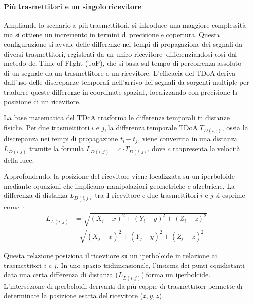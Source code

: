 \paragraph{Più trasmettitori e un singolo ricevitore}

Ampliando lo scenario a più trasmettitori, si introduce una maggiore complessità ma si ottiene un incremento in termini di precisione e copertura. Questa configurazione si avvale delle differenze nei tempi di propagazione dei segnali da diversi trasmettitori, registrati da un unico ricevitore, differenziandosi così dal metodo del Time of Flight (ToF), che si basa sul tempo di percorrenza assoluto di un segnale da un trasmettitore a un ricevitore. L'efficacia del TDoA deriva dall'uso delle discrepanze temporali nell'arrivo dei segnali da sorgenti multiple per tradurre queste differenze in coordinate spaziali, localizzando con precisione la posizione di un ricevitore.

La base matematica del TDoA trasforma le differenze temporali in distanze fisiche. Per due trasmettitori \(i\) e \(j\), la differenza temporale TDoA \(T_{D(i,j)}\), ossia la discrepanza nei tempi di propagazione \(t_i - t_j\), viene convertita in una distanza \(L_{D(i,j)}\) tramite la formula \(L_{D(i,j)} = c \cdot T_{D(i,j)}\), dove \(c\) rappresenta la velocità della luce.

Approfondendo, la posizione del ricevitore viene localizzata su un iperboloide mediante equazioni che implicano manipolazioni geometriche e algebriche. La differenza di distanza \(L_{D(i, j)}\) tra il ricevitore e due trasmettitori \(i\) e \(j\) si esprime come~\cite{zafari2019survey}:
\begin{equation}
    \begin{aligned}
        L_{D(i, j)} & =\sqrt{\left(X_i-x\right)^2+\left(Y_i-y\right)^2+\left(Z_i-z\right)^2} \\
        & -\sqrt{\left(X_j-x\right)^2+\left(Y_j-y\right)^2+\left(Z_j-z\right)^2}
    \end{aligned}
\end{equation}

\noindent Questa relazione posiziona il ricevitore su un iperboloide in relazione ai trasmettitori \(i\) e \(j\). In uno spazio tridimensionale, l'insieme dei punti equidistanti data una certa differenza di distanza (\(L_{D(i, j)}\)) forma un iperboloide. L'intersezione di iperboloidi derivanti da più coppie di trasmettitori permette di determinare la posizione esatta del ricevitore (\(x, y, z\)).


